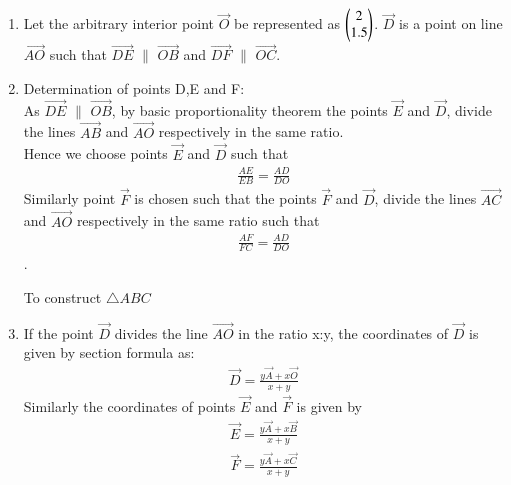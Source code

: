 \begin{enumerate}[label=\thesection.\arabic*.,ref=\thesection.\theenumi]
      
\item   Let the arbitrary interior point $\vec{O}$ be represented as $\begin{pmatrix}2\\1.5\end{pmatrix}$.    
    $\vec{D}$ is a point on line $\vec{AO}$ such that $\vec{DE}$ $\parallel$ $\vec{OB}$ \quad and \quad $\vec{DF}$  $\parallel$  $\vec{OC}$.\\
\item Determination of points D,E and F:\\
As $\vec{DE}$ $\parallel$ $\vec{OB}$, by basic proportionality theorem the points $\vec{E}$ and $\vec{D}$, divide the lines $\vec{AB}$ and $\vec{AO}$ respectively in the same ratio.\\ 
Hence we choose points $\vec{E}$ and $\vec{D}$ such that
 \begin{align}\frac{AE}{EB} = \frac{AD}{DO}\end{align} 
 \quad Similarly point $\vec{F}$ is chosen such that the points $\vec{F}$ and $\vec{D}$, divide the lines $\vec{AC}$ and $\vec{AO}$ respectively in the same ratio such that 
 \begin{align}\frac{AF}{FC} = \frac{AD}{DO}\end{align}.\\
  
  
  \begin{table}[ht]
    \begin{center}
    	
  \caption{To construct $\triangle ABC$}
   \label{table:table2}
   \end{center}	
\end{table}


\item If the point $\vec{D}$ divides the line $\vec{AO}$ in the ratio x:y, the coordinates of $\vec{D}$ is given by section formula as:
\begin{align} \vec{D} = \frac{y\vec{A} + x\vec{O}}{x+y}\end{align}
Similarly the coordinates of points $\vec{E}$ and $\vec{F}$ is given by
\begin{align} \vec{E} = \frac{y\vec{A} + x\vec{B}}{x+y}\end{align}
\begin{align} \vec{F} = \frac{y\vec{A} + x\vec{C}}{x+y}\end{align}


\end{enumerate}
